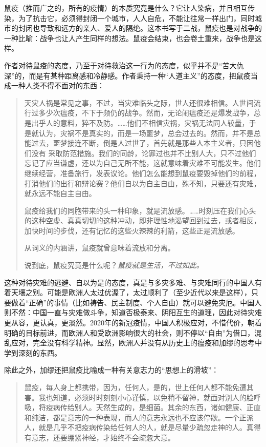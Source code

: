 鼠疫（推而广之的，所有的疫情）的本质究竟是什么？它让人染病，并且相互传染，为了抗击它，必须得封闭一个城市，人人自危，不能让往常一样出门，同时城市的封闭也导致和远方的亲人、爱人的隔绝。这本书写于二战，鼠疫也是对战争的一种比喻：战争也让人产生同样的想法。鼠疫会结束，也会卷土重来，战争也是这样。

作者对待鼠疫的态度，乃至于对待救治这一行为的态度，似乎并不是“苦大仇深”的，而是有某种距离感和冷静感。作者秉持一种“人道主义”的态度，把鼠疫当成一种人类不得不面对的东西：
\begin{quotation}
天灾人祸是常见之事，不过，当灾难临头之际，世人还很难相信。人世间流行过多少次瘟疫，不下于频仍的战争。然而，无论闹瘟疫还是爆发战争，总是出乎人的意料，猝不及防。……他们不相信灾祸，灾祸无法同人较量，于是就认为，灾祸不是真实的，而是一场噩梦，总会过去的。然而，并不是总能过去，噩梦接连不断，倒是人过世了，首先就是那些人本主义者，只因他们没有 采取防范措施。我们的同龄，论罪过也并不比别人大，只不过他们忘记了应当谦虚，还以为自己无所不能，这就意味着灾难不可能发生。他们继续经营，准备旅行，发表议论。他们怎么能想到鼠疫要毁掉他们的前程，打消他们的出行和辩论赛？他们自以为自主自由，殊不知，只要还有灾难，就永远不能自主自由。

鼠疫给我们的同胞带来的头一种印象，就是流放感。……时刻压在我们心头的这种空虚、真真切切的这种冲动，即非理性地渴望回到过去，或者相反，加快时间的步伐，还有记忆的这些火辣辣的利箭，这些正是流放感。

从词义的内涵讲，鼠疫就曾意味着流放和分离。

说到底，鼠疫究竟是什么呢？\emph{鼠疫就是生活，不过如此。}
\end{quotation}

这种对待灾难的逃避、自以为是的态度，真是与多灾多难、与灾难同行的中国人有着天壤之别。可能是欧洲人太过优渥了，太过顺利了（至少近代以来是这样），只要做着“正确”的事情（比如祷告、民主制度、个人自由）就可以避免灾厄。中国人则不然：中国一直与灾难做斗争，知道否极泰来、阴阳互生的道理，因此对待灾难更从容，更认真，更淡然。2020年的新冠疫情，中国人积极应对，不惜代价，朝着明确的目标前进，而欧洲人和受欧洲影响很大的社会，则不停以“自由”为借口，混乱应对，完全没有科学精神。显然，欧洲人并没有从历史上的瘟疫和加缪的思考中学到深刻的东西。

除此之外，加缪还把鼠疫比喻成一种有关意志力的“思想上的滑坡”：
\begin{quotation}
鼠疫，每人身上都携带，因为，任何人，是的，世上任何人都不能免遭其害。我也知道，必须时时刻刻小心谨慎，以免稍不留神，就面对别人的脸呼吸，将疫病传给别人。天然生成的，是细菌。其余的东西，诸如健康、正直和纯洁，都是意志的一种表现，而人的意志永远也不应该停歇。一个正派人，就是几乎不把疫病传染给任何人的人，就是尽量少疏忽走神的人。真得有意志，还要绷紧神经，才始终不会疏忽大意。
\end{quotation}

